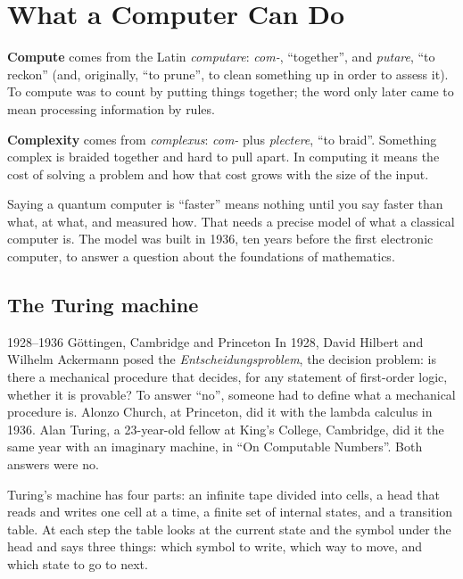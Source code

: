 \chapter{What a Computer Can Do}\label{ch:turing}

\begin{etymology}
\textbf{Compute} comes from the Latin \emph{computare}: \emph{com-},
``together'', and \emph{putare}, ``to reckon'' (and, originally, ``to prune'',
to clean something up in order to assess it). To compute was to count by
putting things together; the word only later came to mean processing
information by rules.

\textbf{Complexity} comes from \emph{complexus}: \emph{com-} plus
\emph{plectere}, ``to braid''. Something complex is braided together and hard to
pull apart. In computing it means the cost of solving a problem and how that
cost grows with the size of the input.
\end{etymology}

Saying a quantum computer is ``faster'' means nothing until you say faster than
what, at what, and measured how. That needs a precise model of what a classical
computer is. The model was built in 1936, ten years before the first electronic
computer, to answer a question about the foundations of mathematics.

\section{The Turing machine}

\begin{history}{1928--1936 \textperiodcentered{} Göttingen, Cambridge and Princeton}
In 1928, David Hilbert and Wilhelm Ackermann posed the
\emph{Entscheidungsproblem}, the decision problem: is there a mechanical
procedure that decides, for any statement of first-order logic, whether it is
provable? To answer ``no'', someone had to define what a mechanical procedure
is. Alonzo Church, at Princeton, did it with the lambda calculus in 1936. Alan
Turing, a 23-year-old fellow at King's College, Cambridge, did it the same year
with an imaginary machine, in ``On Computable Numbers''. Both answers were no.
\end{history}

Turing's machine has four parts: an infinite tape divided into cells, a head that
reads and writes one cell at a time, a finite set of internal states, and a
transition table. At each step the table looks at the current state and the
symbol under the head and says three things: which symbol to write, which way to
move, and which state to go to next.

